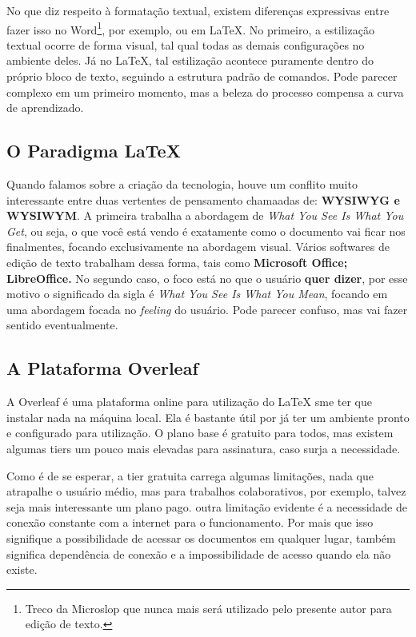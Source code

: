 \documentclass[12pt, a4paper, twocolumn] {article} %
\begin{document}
No que diz respeito à formatação textual, existem diferenças expressivas entre fazer isso no Word\footnote{Treco da Microslop que nunca mais será utilizado pelo presente autor para edição de texto.}, por exemplo, ou em \LaTeX. No primeiro, a estilização textual ocorre de forma visual, tal qual todas as demais configurações no ambiente deles. Já no LaTeX, tal estilização acontece puramente dentro do próprio bloco de texto, seguindo a estrutura padrão de comandos. Pode parecer complexo em um primeiro momento, mas a beleza do processo compensa a curva de aprendizado.

\subsection{O Paradigma LaTeX} %
Quando falamos sobre a criação da tecnologia, houve um conflito muito interessante entre duas vertentes de pensamento chamaadas de: \textbf{WYSIWYG e WYSIWYM}. A primeira trabalha a abordagem de \textit{What You See Is What You Get}, ou seja, o que você está vendo é exatamente como o documento vai ficar nos finalmentes, focando exclusivamente na abordagem visual. Vários softwares de edição de texto trabalham dessa forma, tais como \textbf{Microsoft Office; LibreOffice.} No segundo caso, o foco está no que o usuário \textbf{quer dizer}, por esse motivo o significado da sigla é \textit{What You See Is What You Mean}, focando em uma abordagem focada no \textit{feeling} do usuário. Pode parecer confuso, mas vai fazer sentido eventualmente.

\subsection{A Plataforma Overleaf}
A Overleaf é uma plataforma online para utilização do LaTeX sme ter que instalar nada na máquina local. Ela é bastante útil por já ter um ambiente pronto e configurado para utilização. O plano base é gratuito para todos, mas existem algumas tiers um pouco mais elevadas para assinatura, caso surja a necessidade.

Como é de se esperar, a tier gratuita carrega algumas limitações, nada que atrapalhe o usuário médio, mas para trabalhos colaborativos, por exemplo, talvez seja mais interessante um plano pago. outra limitação evidente é a necessidade de conexão constante com a internet para o funcionamento. Por mais que isso signifique a possibilidade de acessar os documentos em qualquer lugar, também significa dependência de conexão e a impossibilidade de acesso quando ela não existe.
\end{document}

